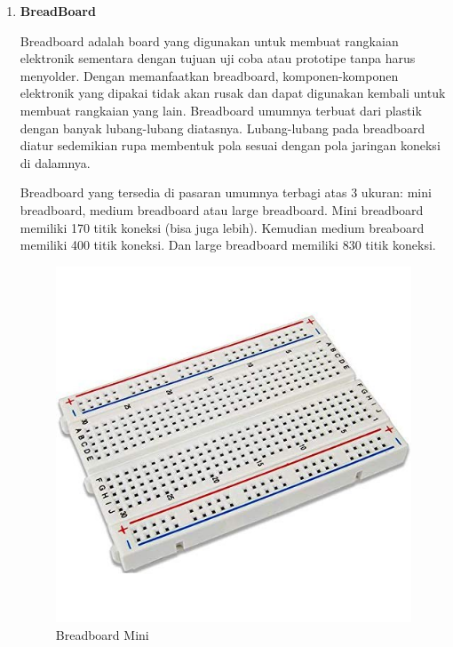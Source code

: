 \begin{enumerate}
\item \textbf{BreadBoard}
\par Breadboard adalah board yang digunakan untuk membuat rangkaian elektronik sementara dengan tujuan uji coba atau prototipe tanpa harus menyolder. Dengan memanfaatkan breadboard, komponen-komponen elektronik yang dipakai tidak akan rusak dan dapat digunakan kembali untuk membuat rangkaian yang lain. Breadboard umumnya terbuat dari plastik dengan banyak lubang-lubang diatasnya. Lubang-lubang pada breadboard diatur sedemikian rupa membentuk pola sesuai dengan pola jaringan koneksi di dalamnya.

\par Breadboard yang tersedia di pasaran umumnya terbagi atas 3 ukuran: mini breadboard, medium breadboard atau large breadboard. Mini breadboard memiliki 170 titik koneksi (bisa juga lebih). Kemudian medium breaboard memiliki 400 titik koneksi. Dan large breadboard memiliki 830 titik koneksi.

\begin{figure}[H]
\centering
\includegraphics[width=1\textwidth]{figures/breadboard.jpg}
\caption{Breadboard Mini}
\label{print}
\end{figure}


\end{enumerate}
